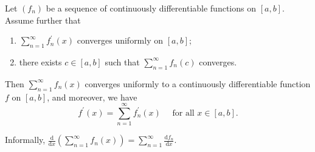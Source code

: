 \documentclass[a4paper,11pt]{article}
\begin{document}
\begin{theorem}\label{thm:5}
    Let $\left(f_{n}\right)$ be a sequence of continuously differentiable functions on $[a, b]$. Assume further that
    \begin{enumerate}
        \item $\sum_{n=1}^{\infty} f_{n}^{\prime}(x)$ converges uniformly on $[a, b]$;
        \item there exists $c \in[a, b]$ such that $\sum_{n=1}^{\infty} f_{n}(c)$ converges.
    \end{enumerate}
    Then $\sum_{n=1}^{\infty} f_{n}(x)$ converges uniformly to a continuously differentiable function $f$ on $[a, b]$, and moreover, we have
    \[
    f^{\prime}(x)=\sum_{n=1}^{\infty} f_{n}^{\prime}(x) \quad \text { for all } x \in[a, b].
    \]
\end{theorem}
\begin{note}
    Informally, $\displaystyle \frac{\mathrm{d}}{\mathrm{d}x}\left( \sum_{n=1}^{\infty}f_n(x) \right) = \sum_{n=1}^{\infty}\frac{\mathrm{d}f_n}{\mathrm{d}x}  $. 
\end{note}
\end{document}
